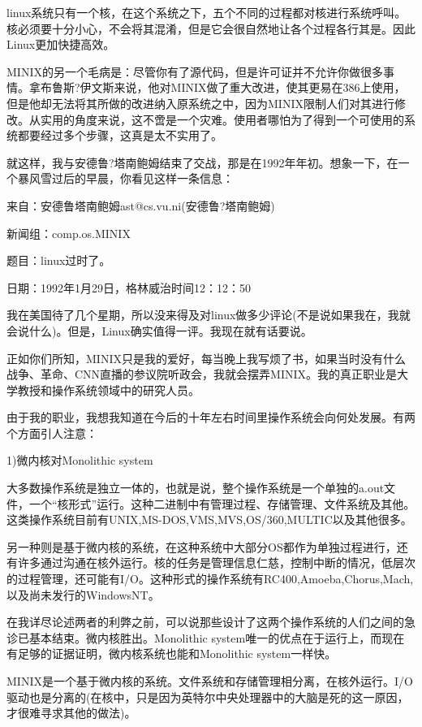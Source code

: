 linux系统只有一个核，在这个系统之下，五个不同的过程都对核进行系统呼叫。核必须要十分小心，不会将其混淆，但是它会很自然地让各个过程各行其是。因此Linux更加快捷高效。

MINIX的另一个毛病是：尽管你有了源代码，但是许可证并不允许你做很多事情。拿布鲁斯?伊文斯来说，他对MINIX做了重大改进，使其更易在386上使用，但是他却无法将其所做的改进纳入原系统之中，因为MINIX限制人们对其进行修改。从实用的角度来说，这不啻是一个灾难。使用者哪怕为了得到一个可使用的系统都要经过多个步骤，这真是太不实用了。

就这样，我与安德鲁?塔南鲍姆结束了交战，那是在1992年年初。想象一下，在一个暴风雪过后的早晨，你看见这样一条信息：

 

来自：安德鲁塔南鲍姆ast@cs.vu.ni(安德鲁?塔南鲍姆)

新闻组：comp.os.MINIX

题目：linux过时了。

日期：1992年1月29日，格林威治时间12：12：50

 

我在美国待了几个星期，所以没来得及对linux做多少评论(不是说如果我在，我就会说什么)。但是，Linux确实值得一评。我现在就有话要说。

正如你们所知，MINIX只是我的爱好，每当晚上我写烦了书，如果当时没有什么战争、革命、CNN直播的参议院听政会，我就会摆弄MINIX。我的真正职业是大学教授和操作系统领域中的研究人员。

由于我的职业，我想我知道在今后的十年左右时间里操作系统会向何处发展。有两个方面引人注意：

1)微内核对Monolithic system

大多数操作系统是独立一体的，也就是说，整个操作系统是一个单独的a.out文件，一个“核形式”运行。这种二进制中有管理过程、存储管理、文件系统及其他。这类操作系统目前有UNIX,MS-DOS,VMS,MVS,OS/360,MULTIC以及其他很多。

另一种则是基于微内核的系统，在这种系统中大部分OS都作为单独过程进行，还有许多通过沟通在核外运行。核的任务是管理信息仁慈，控制中断的情况，低层次的过程管理，还可能有I/O。这种形式的操作系统有RC400,Amoeba,Chorus,Mach,以及尚未发行的WindowsNT。

在我详尽论述两者的利弊之前，可以说那些设计了这两个操作系统的人们之间的急诊已基本结束。微内核胜出。Monolithic system唯一的优点在于运行上，而现在有足够的证据证明，微内核系统也能和Monolithic system一样快。

MINIX是一个基于微内核的系统。文件系统和存储管理相分离，在核外运行。I/O驱动也是分离的(在核中，只是因为英特尔中央处理器中的大脑是死的这一原因，才很难寻求其他的做法)。

